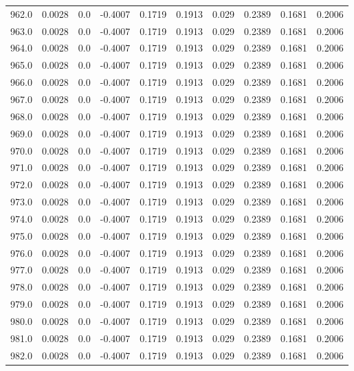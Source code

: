 \begin{longtable}{lrrrrrrrrr}
962.0 & 0.0028 & 0.0 & -0.4007 & 0.1719 & 0.1913 & 0.029 & 0.2389 & 0.1681 & 0.2006 \\
963.0 & 0.0028 & 0.0 & -0.4007 & 0.1719 & 0.1913 & 0.029 & 0.2389 & 0.1681 & 0.2006 \\
964.0 & 0.0028 & 0.0 & -0.4007 & 0.1719 & 0.1913 & 0.029 & 0.2389 & 0.1681 & 0.2006 \\
965.0 & 0.0028 & 0.0 & -0.4007 & 0.1719 & 0.1913 & 0.029 & 0.2389 & 0.1681 & 0.2006 \\
966.0 & 0.0028 & 0.0 & -0.4007 & 0.1719 & 0.1913 & 0.029 & 0.2389 & 0.1681 & 0.2006 \\
967.0 & 0.0028 & 0.0 & -0.4007 & 0.1719 & 0.1913 & 0.029 & 0.2389 & 0.1681 & 0.2006 \\
968.0 & 0.0028 & 0.0 & -0.4007 & 0.1719 & 0.1913 & 0.029 & 0.2389 & 0.1681 & 0.2006 \\
969.0 & 0.0028 & 0.0 & -0.4007 & 0.1719 & 0.1913 & 0.029 & 0.2389 & 0.1681 & 0.2006 \\
970.0 & 0.0028 & 0.0 & -0.4007 & 0.1719 & 0.1913 & 0.029 & 0.2389 & 0.1681 & 0.2006 \\
971.0 & 0.0028 & 0.0 & -0.4007 & 0.1719 & 0.1913 & 0.029 & 0.2389 & 0.1681 & 0.2006 \\
972.0 & 0.0028 & 0.0 & -0.4007 & 0.1719 & 0.1913 & 0.029 & 0.2389 & 0.1681 & 0.2006 \\
973.0 & 0.0028 & 0.0 & -0.4007 & 0.1719 & 0.1913 & 0.029 & 0.2389 & 0.1681 & 0.2006 \\
974.0 & 0.0028 & 0.0 & -0.4007 & 0.1719 & 0.1913 & 0.029 & 0.2389 & 0.1681 & 0.2006 \\
975.0 & 0.0028 & 0.0 & -0.4007 & 0.1719 & 0.1913 & 0.029 & 0.2389 & 0.1681 & 0.2006 \\
976.0 & 0.0028 & 0.0 & -0.4007 & 0.1719 & 0.1913 & 0.029 & 0.2389 & 0.1681 & 0.2006 \\
977.0 & 0.0028 & 0.0 & -0.4007 & 0.1719 & 0.1913 & 0.029 & 0.2389 & 0.1681 & 0.2006 \\
978.0 & 0.0028 & 0.0 & -0.4007 & 0.1719 & 0.1913 & 0.029 & 0.2389 & 0.1681 & 0.2006 \\
979.0 & 0.0028 & 0.0 & -0.4007 & 0.1719 & 0.1913 & 0.029 & 0.2389 & 0.1681 & 0.2006 \\
980.0 & 0.0028 & 0.0 & -0.4007 & 0.1719 & 0.1913 & 0.029 & 0.2389 & 0.1681 & 0.2006 \\
981.0 & 0.0028 & 0.0 & -0.4007 & 0.1719 & 0.1913 & 0.029 & 0.2389 & 0.1681 & 0.2006 \\
982.0 & 0.0028 & 0.0 & -0.4007 & 0.1719 & 0.1913 & 0.029 & 0.2389 & 0.1681 & 0.2006 \\

\end{longtable}
